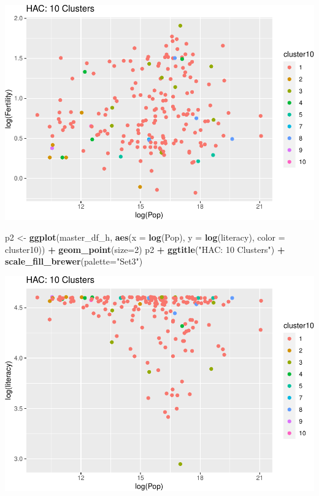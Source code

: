 \documentclass[]{article}
\newenvironment{Shaded}{\begin{snugshade}}{\end{snugshade}}
\newcommand{\DataTypeTok}[1]{\textcolor[rgb]{0.13,0.29,0.53}{#1}}
\newcommand{\DecValTok}[1]{\textcolor[rgb]{0.00,0.00,0.81}{#1}}
\newcommand{\KeywordTok}[1]{\textcolor[rgb]{0.13,0.29,0.53}{\textbf{#1}}}
\newcommand{\NormalTok}[1]{#1}
\newcommand{\OperatorTok}[1]{\textcolor[rgb]{0.81,0.36,0.00}{\textbf{#1}}}
\newcommand{\StringTok}[1]{\textcolor[rgb]{0.31,0.60,0.02}{#1}}
\begin{document}
\includegraphics{eda_files/figure-latex/unnamed-chunk-30-7.pdf}

\begin{Shaded}
\begin{Highlighting}[]
\NormalTok{p2 <-}\StringTok{ }\KeywordTok{ggplot}\NormalTok{(master_df_h, }\KeywordTok{aes}\NormalTok{(}\DataTypeTok{x =} \KeywordTok{log}\NormalTok{(Pop), }\DataTypeTok{y =} \KeywordTok{log}\NormalTok{(literacy), }\DataTypeTok{color =}\NormalTok{ cluster10)) }\OperatorTok{+}
\StringTok{  }\KeywordTok{geom_point}\NormalTok{(}\DataTypeTok{size=}\DecValTok{2}\NormalTok{)}
\NormalTok{p2 }\OperatorTok{+}\StringTok{ }\KeywordTok{ggtitle}\NormalTok{(}\StringTok{"HAC: 10 Clusters"}\NormalTok{) }\OperatorTok{+}\StringTok{ }\KeywordTok{scale_fill_brewer}\NormalTok{(}\DataTypeTok{palette=}\StringTok{"Set3"}\NormalTok{)}
\end{Highlighting}
\end{Shaded}

\includegraphics{eda_files/figure-latex/unnamed-chunk-30-8.pdf}
\end{document}
